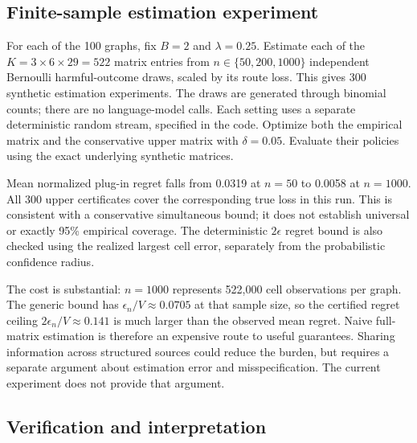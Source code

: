 \documentclass[11pt,letterpaper]{article}
\begin{document}
\subsection{Finite-sample estimation experiment}

For each of the 100 graphs, fix $B=2$ and $\lambda=0.25$. Estimate each of the $K=3\times6\times29=522$ matrix entries from $n\in\{50,200,1000\}$ independent Bernoulli harmful-outcome draws, scaled by its route loss. This gives 300 synthetic estimation experiments. The draws are generated through binomial counts; there are no language-model calls. Each setting uses a separate deterministic random stream, specified in the code. Optimize both the empirical matrix and the conservative upper matrix with $\delta=0.05$. Evaluate their policies using the exact underlying synthetic matrices.

\begin{table}[htbp]
\centering\small
\caption{Synthetic loss-matrix estimation. Regret is the empirical-matrix policy's true robust excess loss, normalized by $V=\max_Cv_C$. Coverage counts settings where the upper-matrix policy's reported bound covers its true loss. Total draws are per graph, not across the entire suite.}
\label{tab:sampling}

\end{table}

Mean normalized plug-in regret falls from 0.0319 at $n=50$ to 0.0058 at $n=1000$. All 300 upper certificates cover the corresponding true loss in this run. This is consistent with a conservative simultaneous bound; it does not establish universal or exactly 95\% empirical coverage. The deterministic $2\epsilon$ regret bound is also checked using the realized largest cell error, separately from the probabilistic confidence radius.

The cost is substantial: $n=1000$ represents 522,000 cell observations per graph. The generic bound has $\epsilon_n/V\approx0.0705$ at that sample size, so the certified regret ceiling $2\epsilon_n/V\approx0.141$ is much larger than the observed mean regret. Naive full-matrix estimation is therefore an expensive route to useful guarantees. Sharing information across structured sources could reduce the burden, but requires a separate argument about estimation error and misspecification. The current experiment does not provide that argument.

\subsection{Verification and interpretation}
\end{document}
